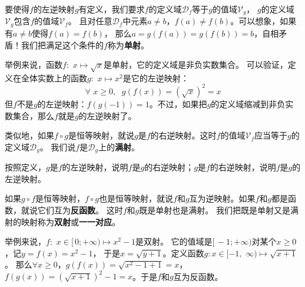 \documentclass[12pt,UTF8]{ctexbook}
\begin{document}
要使得$f$的左逆映射$g$有定义，我们要求$f$的定义域$\mathcal{D}_f$等于$g$的值域$\mathcal{V}_g$，
$g$的定义域$\mathcal{V}_g$包含$f$的值域$\mathcal{V}_f$。
且对任意$\mathcal{D}_f$中元素$a \neq b$，$f(a) \neq f(b)$。可以想象，如果有$a \neq b$使得$f(a) = f(b)$，
那么$a = g(f(a)) = g(f(b)) = b$，自相矛盾！我们把满足这个条件的$f$称为\textbf{单射}。

举例来说，函数$f: \,\,x \mapsto \sqrt{x}$是单射，它的定义域是非负实数集合。
可以验证，定义在全体实数上的函数$g:\,\, x \mapsto x^2$是它的左逆映射：
$$ \forall \,\, x \geqslant 0, \;\,\, g(f(x)) = \left(\sqrt{x}\right)^2 = x$$
但$f$不是$g$的左逆映射：$f(g(-1)) = 1$。不过，如果把$g$的定义域缩减到非负实数集合，那么$f$就是$g$的左逆映射了。

类似地，如果$f\circ g$是恒等映射，就说$g$是$f$的右逆映射。这时$f$的值域$\mathcal{V}_f$应当等于$g$的定义域$\mathcal{D}_g$。
我们说$f$是$\mathcal{D}_g$上的\textbf{满射}。

按照定义，$g$是$f$的左逆映射，说明$f$是$g$的右逆映射；$g$是$f$的右逆映射，说明$f$是$g$的左逆映射。

如果$g\circ f$是恒等映射，$f\circ g$也是恒等映射，就说$f$和$g$互为逆映射。如果$f$和$g$都是函数，就说它们互为\textbf{反函数}。
这时$f$和$g$既是单射也是满射。
我们把既是单射又是满射的映射称为\textbf{双射}或\textbf{一一对应}。

举例来说，$f: \,\,x\in[\,0;+\infty) \mapsto x^2 - 1$是双射。
它的值域是$[\,-1;+\infty)$对某个$x\geqslant 0$，记$y = f(x) = x^2 - 1$，
于是$x = \sqrt{y + 1}$。定义函数$g:x\in[-1, \,\,\infty)\mapsto\sqrt{x + 1}$。
那么$\forall x \geqslant 0$，$g(f(x)) = \sqrt{x^2 - 1 + 1} = x$，
$f(g(x)) = \left(\sqrt{x + 1}\right)^2 - 1 = x$。于是$f$和$g$互为反函数。
\end{document}
